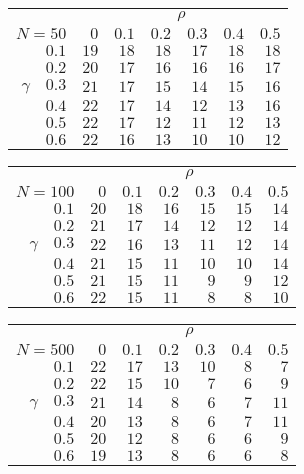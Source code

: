\begin{tabular}{r|rrrrrr}
\hline\hline
 &\multicolumn{6}{c}{$\rho$} \\ 
 $N = 50$ & $0$ & $0.1$ & $0.2$ & $0.3$ & $0.4$ & $0.5$ \\ 
 \hline$0.1$ & $19$ & $18$ & $18$ & $17$ & $18$ & $18$\\ 
$0.2$ & $20$ & $17$ & $16$ & $16$ & $16$ & $17$\\ 
$\gamma\quad$$0.3$ & $21$ & $17$ & $15$ & $14$ & $15$ & $16$\\ 
$0.4$ & $22$ & $17$ & $14$ & $12$ & $13$ & $16$\\ 
$0.5$ & $22$ & $17$ & $12$ & $11$ & $12$ & $13$\\ 
$0.6$ & $22$ & $16$ & $13$ & $10$ & $10$ & $12$\\ 
 \hline 
 \end{tabular}
 
 \vspace{2em} 
 
\begin{tabular}{r|rrrrrr}
\hline\hline
 &\multicolumn{6}{c}{$\rho$} \\ 
 $N = 100$ & $0$ & $0.1$ & $0.2$ & $0.3$ & $0.4$ & $0.5$ \\ 
 \hline$0.1$ & $20$ & $18$ & $16$ & $15$ & $15$ & $14$\\ 
$0.2$ & $21$ & $17$ & $14$ & $12$ & $12$ & $14$\\ 
$\gamma\quad$$0.3$ & $22$ & $16$ & $13$ & $11$ & $12$ & $14$\\ 
$0.4$ & $21$ & $15$ & $11$ & $10$ & $10$ & $14$\\ 
$0.5$ & $21$ & $15$ & $11$ & $9$ & $9$ & $12$\\ 
$0.6$ & $22$ & $15$ & $11$ & $8$ & $8$ & $10$\\ 
 \hline 
 \end{tabular}
 
 \vspace{2em} 
 
\begin{tabular}{r|rrrrrr}
\hline\hline
 &\multicolumn{6}{c}{$\rho$} \\ 
 $N = 500$ & $0$ & $0.1$ & $0.2$ & $0.3$ & $0.4$ & $0.5$ \\ 
 \hline$0.1$ & $22$ & $17$ & $13$ & $10$ & $8$ & $7$\\ 
$0.2$ & $22$ & $15$ & $10$ & $7$ & $6$ & $9$\\ 
$\gamma\quad$$0.3$ & $21$ & $14$ & $8$ & $6$ & $7$ & $11$\\ 
$0.4$ & $20$ & $13$ & $8$ & $6$ & $7$ & $11$\\ 
$0.5$ & $20$ & $12$ & $8$ & $6$ & $6$ & $9$\\ 
$0.6$ & $19$ & $13$ & $8$ & $6$ & $6$ & $8$\\ 
 \hline 
 \end{tabular}
